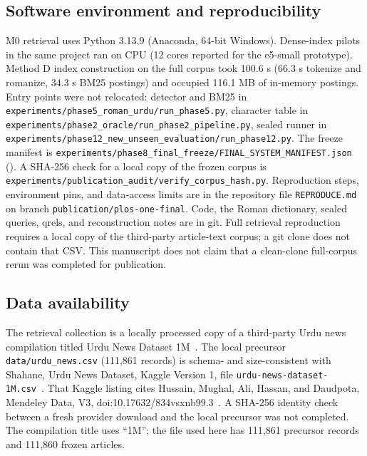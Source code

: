 \documentclass[10pt,letterpaper]{article}
\begin{document}
\subsection*{Software environment and reproducibility}

M0 retrieval uses Python 3.13.9 (Anaconda, 64-bit Windows). Dense-index pilots in the same project ran on CPU (12 cores reported for the e5-small prototype). Method D index construction on the full corpus took 100.6 s (66.3 s tokenize and romanize, 34.3 s BM25 postings) and occupied 116.1 MB of in-memory postings. Entry points were not relocated: detector and BM25 in \texttt{experiments/phase5\_roman\_urdu/run\_phase5.py}, character table in \texttt{experiments/phase2\_oracle/run\_phase2\_pipeline.py}, sealed runner in \texttt{experiments/phase12\_new\_unseen\_evaluation/run\_phase12.py}. The freeze manifest is \texttt{experiments/phase8\_final\_freeze/FINAL\_SYSTEM\_MANIFEST.json} (). A SHA-256 check for a local copy of the frozen corpus is \texttt{experiments/publication\_audit/verify\_corpus\_hash.py}. Reproduction steps, environment pins, and data-access limits are in the repository file \texttt{REPRODUCE.md} on branch \texttt{publication/plos-one-final}. Code, the Roman dictionary, sealed queries, qrels, and reconstruction notes are in git. Full retrieval reproduction requires a local copy of the third-party article-text corpus; a git clone does not contain that CSV. This manuscript does not claim that a clean-clone full-corpus rerun was completed for publication.

\subsection*{Data availability}

The retrieval collection is a locally processed copy of a third-party Urdu news compilation titled Urdu News Dataset 1M~\cite{bib16}. The local precursor \texttt{data/urdu\_news.csv} (111,861 records) is schema- and size-consistent with Shahane, Urdu News Dataset, Kaggle Version 1, file \texttt{urdu-news-dataset-1M.csv}~\cite{bib17}. That Kaggle listing cites Hussain, Mughal, Ali, Hassan, and Daudpota, Mendeley Data, V3, doi:10.17632/834vsxnb99.3~\cite{bib16}. A SHA-256 identity check between a fresh provider download and the local precursor was not completed. The compilation title uses ``1M''; the file used here has 111,861 precursor records and 111,860 frozen articles.
\end{document}
